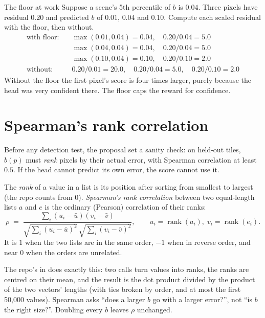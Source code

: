 \begin{worked}[label={we:uncertainty:floor}]{The floor at work}
Suppose a scene's 5th percentile of $b$ is $0.04$. Three pixels have residual $0.20$ and predicted $b$ of
$0.01$, $0.04$ and $0.10$. Compute each scaled residual with the floor, then without.
\begin{align*}
\text{with floor:}\quad & \max(0.01,0.04)=0.04,\quad 0.20/0.04 = 5.0\\
& \max(0.04,0.04)=0.04,\quad 0.20/0.04 = 5.0\\
& \max(0.10,0.04)=0.10,\quad 0.20/0.10 = 2.0\\
\text{without:}\quad & 0.20/0.01 = 20.0,\quad 0.20/0.04 = 5.0,\quad 0.20/0.10=2.0
\end{align*}
Without the floor the first pixel's score is four times larger, purely because the head was very confident
there. The floor caps the reward for confidence.
\end{worked}

\section{Spearman's rank correlation}\label{sec:uncertainty:spearman}

Before any detection test, the proposal set a sanity check: on held-out tiles, $b(p)$ must \emph{rank}
pixels by their actual error, with Spearman correlation at least $0.5$. If the head cannot predict its own
error, the score cannot use it.

\begin{definition}
The \emph{rank} of a value in a list is its position after sorting from smallest to
largest (the repo counts from 0). \emph{Spearman's rank correlation}
\citep{spearman1904proof} between two equal-length lists $a$ and $e$ is the ordinary (Pearson) correlation of
their ranks:
\begin{equation}\label{eq:uncertainty:spearman}
\rho \;=\; \frac{\sum_i (u_i-\bar u)(v_i-\bar v)}{\sqrt{\sum_i (u_i-\bar u)^2}\,\sqrt{\sum_i(v_i-\bar v)^2}},
\qquad u_i=\operatorname{rank}(a_i),\; v_i=\operatorname{rank}(e_i).
\end{equation}
It is $1$ when the two lists are in the same order, $-1$ when in reverse order, and near $0$ when the orders are
unrelated.
\end{definition}

The repo's  in  does exactly this:
two  calls turn values into ranks, the ranks are centred on their mean, and the result is the dot
product divided by the product of the two vectors' lengths (with ties broken by order, and at most the first
50,000 values). Spearman asks ``does a larger $b$ go with a larger error?'', not ``is $b$ the right size?''.
Doubling every $b$ leaves $\rho$ unchanged.

